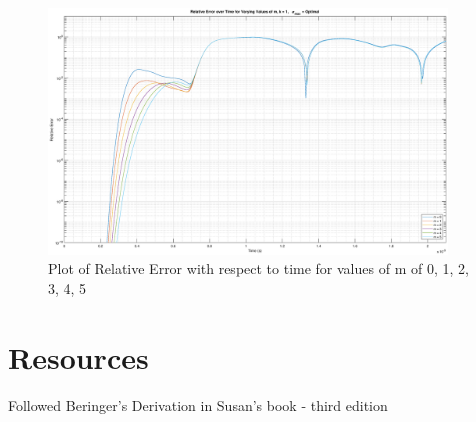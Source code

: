 \documentclass{article}
\begin{document}
\begin{figure}
  \centering
  \includegraphics[width=400]{Rel_Err_m}
  \caption{Plot of Relative Error with respect to time for values of m of 0, 1,
    2, 3, 4, 5}\label{fig:RelErrm}
\end{figure}




\section{Resources}
Followed Beringer's Derivation in Susan's book - third edition
\end{document}
